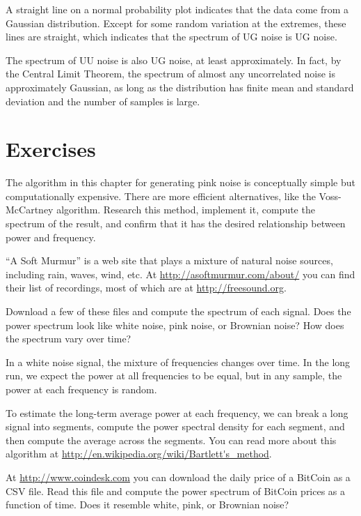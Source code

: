 \documentclass[12pt]{book}
\begin{document}
A straight line on a normal probability plot indicates
that the data come from a Gaussian distribution.  Except for
some random variation at the extremes, these lines are straight,
which indicates that the spectrum of UG noise is UG noise.

The spectrum of UU noise is also UG noise, at least approximately.  In
fact, by the Central Limit Theorem, the spectrum of almost any
uncorrelated noise is approximately Gaussian, as long as the
distribution has finite mean and standard deviation and the number of
samples is large.


\section{Exercises}

\begin{exercise}
The algorithm in this chapter for generating pink noise is
conceptually simple but computationally expensive.  There are
more efficient alternatives, like the Voss-McCartney algorithm.
Research this method, implement it, compute the spectrum of
the result, and confirm that it has the desired relationship
between power and frequency.
\end{exercise}


\begin{exercise}
``A Soft Murmur'' is a web site that plays a mixture of natural
noise sources, including rain, waves, wind, etc.  At
\url{http://asoftmurmur.com/about/} you can find their list
of recordings, most of which are at \url{http://freesound.org}.

Download a few of these files and compute the spectrum of each
signal.  Does the power spectrum look like white noise, pink noise,
or Brownian noise?  How does the spectrum vary over time?
\end{exercise}


\begin{exercise}

In a white noise signal, the mixture of frequencies changes over time.
In the long run, we expect the power at all frequencies to be equal,
but in any sample, the power at each frequency is random.

To estimate the long-term average power at each frequency, we can
break a long signal into segments, compute the power spectral
density for each segment, and then compute the average across
the segments.  You can read more about this algorithm at
\url{http://en.wikipedia.org/wiki/Bartlett's_method}.

At \url{http://www.coindesk.com} you can download the daily
price of a BitCoin as a CSV file.  Read this file and compute
the power spectrum of BitCoin prices as a function of time.
Does it resemble white, pink, or Brownian noise?
\end{exercise}
\end{document}
